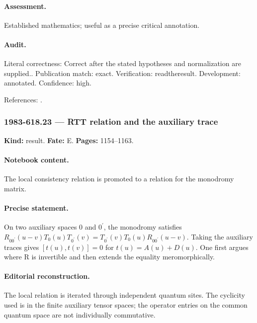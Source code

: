 \paragraph{Assessment.} Established mathematics; useful as a precise critical annotation.

\paragraph{Audit.} Literal correctness: Correct after the stated hypotheses and normalization are supplied.. Publication match: exact. Verification: readtheresult. Development: annotated. Confidence: high.

\noindent References: \citep{sklyaninfaddeev1978quantum,faddeev1996bethe}.\par

\subsubsection{1983-618.23 --- RTT relation and the auxiliary trace}

\label{item:1983-618.23}

\noindent\textbf{Kind:} result. \textbf{Fate:} E. \textbf{Pages:} 1154--1163.\par

\paragraph{Notebook content.} The local consistency relation is promoted to a relation for the monodromy matrix.

\paragraph{Precise statement.} On two auxiliary spaces 0 and $0^\prime$, the monodromy satisfies $R_{00^\prime}(u-v)T_0(u)T_{0^\prime}(v)=T_{0^\prime}(v)T_0(u)R_{00^\prime}(u-v)$. Taking the auxiliary traces gives $[t(u),t(v)]=0$ for $t(u)=A(u)+D(u)$. One first argues where R is invertible and then extends the equality meromorphically.

\paragraph{Editorial reconstruction.} The local relation is iterated through independent quantum sites. The cyclicity used is in the finite auxiliary tensor spaces; the operator entries on the common quantum space are not individually commutative.

